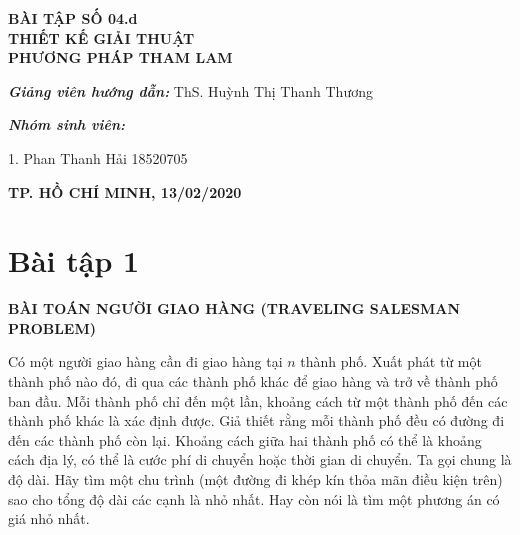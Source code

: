 \documentclass[12pt, a4paper, fleqn]{article}
\begin{document}
\begin{titlepage}
\begin{center}
			\vspace{1.5cm}
			
			\Large
			\textbf{BÀI TẬP SỐ 04.d\\THIẾT KẾ GIẢI THUẬT\\PHƯƠNG PHÁP THAM LAM}
		
		\end{center}
			
			\vspace{2.5cm}
			\normalsize	
			
			\hspace{70pt} \textbf{\textit{Giảng viên hướng dẫn:}} ThS. Huỳnh Thị Thanh Thương\\
			
			\vspace*{1cm}
			
			\hspace{70pt} \textbf{\textit{Nhóm sinh viên:}}
			
			\vspace*{0.4cm}

			\hspace{70pt} 1. \hspace{10pt} Phan Thanh Hải  \hspace{45pt} 18520705
			
			\vspace{4cm}
		
		\begin{center}
			\textbf{TP. HỒ CHÍ MINH, 13/02/2020}
		\end{center}
			
	\end{titlepage}

	\begin{center}
		\tableofcontents
	\end{center}
	\clearpage
	
	\setlength{\abovedisplayskip}{5pt}
	\setlength{\belowdisplayskip}{5pt}
	
	
	\section*{Bài tập 1}
	
	
	\textbf{BÀI TOÁN NGƯỜI GIAO HÀNG (TRAVELING SALESMAN PROBLEM)}
	
	Có một người giao hàng cần đi giao hàng tại $n$ thành phố. Xuất phát từ một thành phố nào đó, đi qua các thành phố khác để giao hàng và trở về thành phố ban đầu. Mỗi thành phố chỉ đến một lần, khoảng cách từ một thành phố đến các thành phố khác là xác định được. Giả thiết rằng mỗi thành phố đều có đường đi đến các thành phố còn lại. Khoảng cách giữa hai thành phố có thể là khoảng cách địa lý, có thể là cước phí di chuyển hoặc thời gian di chuyển. Ta gọi chung là độ dài. Hãy tìm một chu trình (một đường đi khép kín thỏa mãn điều kiện trên) sao cho tổng độ dài các cạnh là nhỏ nhất. Hay còn nói là tìm một phương án có giá nhỏ nhất.
	
\end{document}
